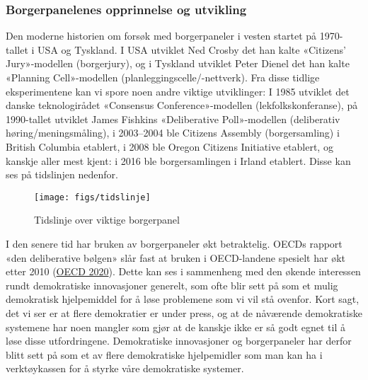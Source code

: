 \documentclass[
  12pt,
  a4paper, 12pt]{article}
\begin{document}
\hypertarget{borgerpanelenes-opprinnelse-og-utvikling}{%
\subsubsection{Borgerpanelenes opprinnelse og utvikling}\label{borgerpanelenes-opprinnelse-og-utvikling}}

Den moderne historien om forsøk med borgerpaneler i vesten startet på 1970-tallet i USA og Tyskland. I USA utviklet Ned Crosby det han kalte «Citizens' Jury»-modellen (borgerjury), og i Tyskland utviklet Peter Dienel det han kalte «Planning Cell»-modellen (planleggingscelle/-nettverk). Fra disse tidlige eksperimentene kan vi spore noen andre viktige utviklinger: I 1985 utviklet det danske teknologirådet «Consensus Conference»-modellen (lekfolkskonferanse), på 1990-tallet utviklet James Fishkins «Deliberative Poll»-modellen (deliberativ høring/meningsmåling), i 2003--2004 ble Citizens Assembly (borgersamling) i British Columbia etablert, i 2008 ble Oregon Citizens Initiative etablert, og kanskje aller mest kjent: i 2016 ble borgersamlingen i Irland etablert. Disse kan ses på tidslinjen nedenfor.

\begin{figure}

{\centering \texttt{[image: figs/tidslinje]} 

}

\caption{Tidslinje over viktige borgerpanel}\label{fig:unnamed-chunk-2}
\end{figure}

I den senere tid har bruken av borgerpaneler økt betraktelig. OECDs rapport «den deliberative bølgen» slår fast at bruken i OECD-landene spesielt har økt etter 2010 (\protect\hyperlink{ref-oecd_innovative_2020}{OECD 2020}). Dette kan ses i sammenheng med den økende interessen rundt demokratiske innovasjoner generelt, som ofte blir sett på som et mulig demokratisk hjelpemiddel for å løse problemene som vi vil stå ovenfor. Kort sagt, det vi ser er at flere demokratier er under press, og at de nåværende demokratiske systemene har noen mangler som gjør at de kanskje ikke er så godt egnet til å løse disse utfordringene. Demokratiske innovasjoner og borgerpaneler har derfor blitt sett på som et av flere demokratiske hjelpemidler som man kan ha i verktøykassen for å styrke våre demokratiske systemer.
\end{document}
